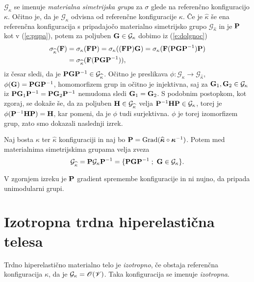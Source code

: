 $\mathcal{G}_{\kappa}$ se imenuje \emph{materialna simetrijska grupa} za $\sigma$ glede
na referenčno konfiguracijo $\kappa$. Očitno je, da je $\mathcal{G}_{\kappa}$ odvisna od
referenčne konfiguracije $\kappa$. Če je $\widehat{\kappa}$ še ena referenčna konfiguracija
s pripadajočo materialno simetrijsko grupo $\mathcal{G}_{\widehat{\kappa}}$
in je $\mathbf P$ kot v (\ref{e:pupa}), potem za poljuben
$\mathbf G\in\mathcal{G}_{\kappa}$ dobimo iz (\ref{e:dolgnoc})
\begin{align*}
	\sigma_{\widehat{\kappa}}(\mathbf F)&=\sigma_{\kappa}(\mathbf F\mathbf P)
	=\sigma_{\kappa}((\mathbf F\mathbf P)\mathbf G)
	=\sigma_{\kappa}(\mathbf F(\mathbf P\mathbf G\mathbf P^{-1})\mathbf P) \\
	&=\sigma_{\widehat{\kappa}}(\mathbf F(\mathbf P\mathbf G\mathbf P^{-1})),
\end{align*}
iz česar sledi, da je $\mathbf P\mathbf G\mathbf P^{-1}\in\mathcal{G}_{\widehat{\kappa}}$.
Očitno je preslikava $\phi\colon\mathcal{G}_{\kappa}\to\mathcal{G}_{\widehat{\kappa}}$,
$\phi(\mathbf G)=\mathbf P\mathbf G\mathbf P^{-1}$, homomorfizem grup in očitno je injektivna,
saj za $\mathbf G_1,\mathbf G_2\in\mathcal{G}_{\kappa}$ iz
$\mathbf P\mathbf G_1\mathbf P^{-1}=\mathbf P\mathbf G_2\mathbf P^{-1}$ nemudoma sledi $\mathbf G_1=\mathbf G_2$.
S podobnim postopkom, kot zgoraj, se dokaže še, da za poljuben $\mathbf H\in\mathcal{G}_{\widehat{\kappa}}$
velja $\mathbf P^{-1}\mathbf H\mathbf P\in\mathcal{G}_{\kappa}$, torej je
$\phi(\mathbf P^{-1}\mathbf H\mathbf P)=\mathbf H$, kar pomeni, da je $\phi$ tudi surjektivna.
$\phi$ je torej izomorfizem grup, zato smo dokazali naslednji izrek.

\begin{izrek}
	Naj bosta $\kappa$ ter $\widehat{\kappa}$ konfiguraciji in naj bo
	$\mathbf P=\mathrm{Grad}(\widehat{\boldsymbol \kappa}\circ\boldsymbol \kappa^{-1})$. Potem
	med materialnima simetrijskima grupama velja zveza
	\[
		\mathcal{G}_{\widehat{\kappa}}=\ten{P}\mathcal{G}_{\kappa}\ten{P}^{-1}
		=\{\ten{P}\ten{G}\ten{P}^{-1}\;;\ \ten{G}\in\mathcal{G}_{\kappa}\}.
	\]
\end{izrek}

V zgornjem izreku je $\mathbf P$ gradient spremembe konfiguracije in ni nujno,
da pripada unimodularni grupi.


\section{Izotropna trdna hiperelastična telesa}


\begin{definicija}
	Trdno hiperelastično materialno telo je \emph{izotropno}, če obstaja referenčna
	konfiguracija $\kappa$, da je $\mathcal{G}_{\kappa}=\mathscr{O}(\mathscr V)$. Taka konfiguracija
	se imenuje \emph{izotropna}.
\end{definicija}

